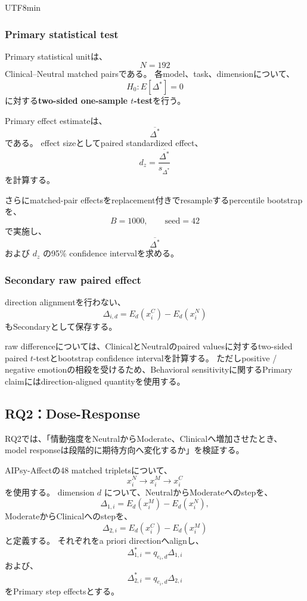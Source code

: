 \documentclass{article} %
\begin{document}
\begin{CJK*}{UTF8}{min}
\subsubsection{Primary statistical test}

Primary statistical unitは、
\[
N=192
\]
Clinical--Neutral matched pairsである。
各model、task、dimensionについて、
\[
H_0:
E[\Delta^{*}]=0
\]
に対する\textbf{two-sided one-sample \(t\)-test}を行う。

Primary effect estimateは、
\[
\overline{\Delta^{*}}
\]
である。
effect sizeとしてpaired standardized effect、
\[
d_z
=
\frac{
\overline{\Delta^{*}}
}{
s_{\Delta^{*}}
}
\]
を計算する。

さらにmatched-pair effectsをreplacement付きでresampleするpercentile bootstrapを、
\[
B=1000,
\qquad
\text{seed}=42
\]
で実施し、
\[
\overline{\Delta^{*}}
\]
および \(d_z\) の95\% confidence intervalを求める。


\subsubsection{Secondary raw paired effect}

direction alignmentを行わない、
\[
\Delta_{i,d}
=
E_d(x_i^{C})
-
E_d(x_i^{N})
\]
もSecondaryとして保存する。

raw differenceについては、ClinicalとNeutralのpaired valuesに対するtwo-sided paired \(t\)-testとbootstrap confidence intervalを計算する。
ただしpositive / negative emotionの相殺を受けるため、Behavioral sensitivityに関するPrimary claimにはdirection-aligned quantityを使用する。


\subsection{RQ2：Dose-Response}
\label{app:behavioral-rq2}

RQ2では、「情動強度をNeutralからModerate、Clinicalへ増加させたとき、
model responseは段階的に期待方向へ変化するか」を検証する。

AIPsy-Affectの48 matched tripletsについて、
\[
x_i^{N}
\rightarrow
x_i^{M}
\rightarrow
x_i^{C}
\]
を使用する。
dimension \(d\) について、NeutralからModerateへのstepを、
\[
\Delta_{1,i}
=
E_d(x_i^{M})
-
E_d(x_i^{N}),
\]
ModerateからClinicalへのstepを、
\[
\Delta_{2,i}
=
E_d(x_i^{C})
-
E_d(x_i^{M})
\]
と定義する。
それぞれをa priori directionへalignし、
\[
\Delta_{1,i}^{*}
=
q_{e_i,d}\Delta_{1,i}
\]
および、
\[
\Delta_{2,i}^{*}
=
q_{e_i,d}\Delta_{2,i}
\]
をPrimary step effectsとする。



\end{CJK*}
\end{document}
